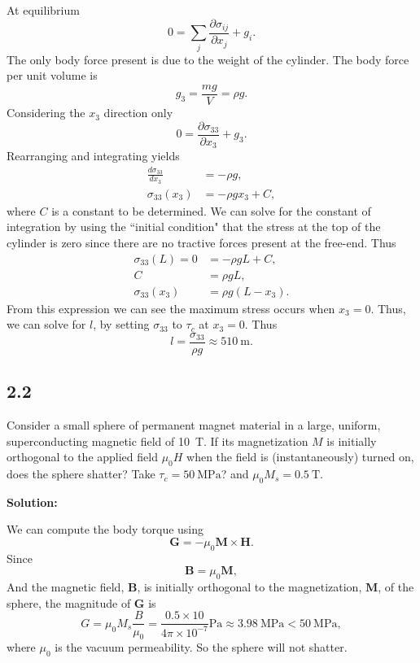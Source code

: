 \documentclass[12pt]{article}
\begin{document}
At equilibrium
\begin{equation}
	0 = \sum_{j}\frac{\partial \sigma_{ij}}{\partial x_j} + g_{i}.
\end{equation}
The only body force present is due to the weight of the cylinder. The body force per unit volume is
\begin{equation}
	g_3 = \frac{m g}{V} = \rho g.
\end{equation}
Considering the $x_3$ direction only
\begin{equation}
	0 = \frac{\partial \sigma_{33}}{\partial x_3} + g_{3}.
\end{equation}
Rearranging and integrating yields
\begin{align}
	\frac{ d\sigma_{33} }{ d x_3 } & = -\rho g,         \\
	\sigma_{33}(x_3)               & = -\rho g x_3 + C,
\end{align}
where $C$ is a constant to be determined.
We can solve for the constant of integration by using the ``initial condition"
that the stress at the top of the
cylinder is zero since there are no tractive forces present at the free-end. Thus
\begin{align}
	\sigma_{33}(L) = 0 & = -\rho g L + C,    \\
	C                  & = \rho g L,         \\
	\sigma_{33}(x_3)   & = \rho g (L - x_3).
\end{align}
From this expression we can see
the maximum stress occurs when $x_3 = 0$.
Thus, we can solve for $l$, by setting $\sigma_{33}$ to $\tau_c$ at $x_3 = 0$. Thus
\begin{equation}
	l = \frac{\sigma_{33}}{\rho g} \approx \SI{510}{\meter}.
\end{equation}

\subsection{2.2}
Consider a small sphere of  permanent magnet material in a large,
uniform, superconducting magnetic field of \SI{10}{\tesla}. If its magnetization $M$
is initially orthogonal to the applied field $\mu_0 H$ when the field is (instantaneously)
turned on, does the sphere shatter? Take $\tau_c = \SI{50}{\mega\pascal}$? and
$\mu_0 M_s = \SI{0.5}{\tesla}$.

\textbf{Solution:}

We can compute the body torque using
\begin{equation}
	\bm{G} = -\mu_0 \bm{M} \times \bm{H}.
\end{equation}
Since
\begin{equation}
	\bm{B} = \mu_{0} \bm{M},
\end{equation}
And the magnetic field, $\bm{B}$, is initially orthogonal to the magnetization, $\bm{M}$,
of the sphere, the magnitude of $\bm{G}$ is
\begin{equation}
	G = \mu_0 M_s \frac{B}{\mu_0} = \frac{0.5 \times 10}{4 \pi \times 10^{-7}} \si{\pascal} \approx \SI{3.98}{\mega\pascal} < \SI{50}{\mega\pascal},
\end{equation}
where $\mu_0$ is the vacuum permeability.
So the sphere will not shatter.
\end{document}
